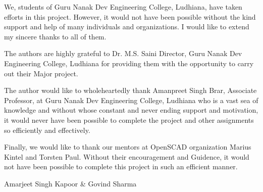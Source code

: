 \begin{Large}
\end{Large}

We, students of Guru Nanak Dev Engineering College, Ludhiana, have taken efforts in this project.
However, it would not have been possible without the kind support and help of many individuals
and organizations. I would like to extend my sincere thanks to all of them.

The authors are highly grateful to Dr. M.S. Saini Director, Guru Nanak Dev Engineering College, Ludhiana for providing them with the opportunity to carry out their Major project.

The author would like to wholeheartedly thank Amanpreet Singh Brar, Associate Professor, at Guru Nanak Dev Engineering College, Ludhiana who is a vast sea of knowledge and
without whose constant and never ending support and motivation, it would never have been
possible to complete the project and other assignments so efficiently and effectively.

Finally, we would like to thank our mentors at OpenSCAD organization Marius Kintel and Torsten Paul. Without their encouragement and Guidence, it would not have been possible to complete this project
in such an efficient manner.

\vskip 1.0cm 
\noindent Amarjeet Singh Kapoor \& Govind Sharma
